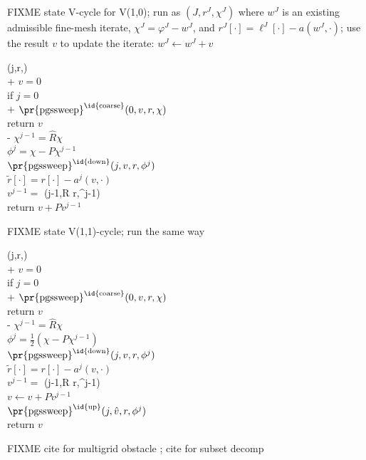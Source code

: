 \documentclass[letterpaper,final,12pt,reqno]{amsart}
\theoremstyle{claim}
\numberwithin{equation}{section}
\numberwithin{figure}{section}
\numberwithin{table}{section}
\begin{document}
FIXME state V-cycle for V(1,0); run as $(J,r^J,\chi^J)$ where $w^J$ is an existing admissible fine-mesh iterate, $\chi^J=\varphi^J-w^J$, and $r^J[\cdot] = \ell^J[\cdot] - a(w^J,\cdot)$; use the result $v$ to update the iterate: $w^J \gets w^J + v$
\begin{pseudo*}
(j,r,\chi)\text{:} \\+
    $v=0$ \\
    if $j=0$ \\+
        $\text{\pr{pgssweep}}^{\text{\id{coarse}}}(0,v,r,\chi)$ \\
        return $v$ \\-
    $\chi^{j-1} = \hat R \chi$ \\
    $\phi^j = \chi - P\chi^{j-1}$ \\
    $\text{\pr{pgssweep}}^{\text{\id{down}}}(j,v,r,\phi^j)$ \\
    $\tilde r[\cdot] = r[\cdot] - a^j(v,\cdot)$ \\
    $v^{j-1} =$ (j-1,R \tilde r,\chi^{j-1}) \\
    return $v + P v^{j-1}$
\end{pseudo*}


FIXME state V(1,1)-cycle; run the same way
\begin{pseudo*}
(j,r,\chi)\text{:} \\+
    $v=0$ \\
    if $j=0$ \\+
        $\text{\pr{pgssweep}}^{\text{\id{coarse}}}(0,v,r,\chi)$ \\
        return $v$ \\-
    $\chi^{j-1} = \hat R \chi$ \\
    $\phi^j = \frac{1}{2} (\chi - P\chi^{j-1})$ \\
    $\text{\pr{pgssweep}}^{\text{\id{down}}}(j,v,r,\phi^j)$ \\
    $\tilde r[\cdot] = r[\cdot] - a^j(v,\cdot)$ \\
    $v^{j-1} =$ (j-1,R \tilde r,\chi^{j-1}) \\
    $v \gets v + P v^{j-1}$ \\
    $\text{\pr{pgssweep}}^{\text{\id{up}}}(j,\hat v,r,\phi^j)$ \\
    return $v$
\end{pseudo*}

FIXME cite for multigrid obstacle \cite{BrandtCryer1983,Bueler2021,GraeserKornhuber2009,Jouvetetal2013}; cite for subset decomp \cite{Tai2003}
\end{document}
